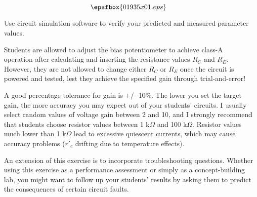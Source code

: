 

$$\epsfbox{01935x01.eps}$$

\vfil \eject






Use circuit simulation software to verify your predicted and measured parameter values.







Students are allowed to adjust the bias potentiometer to achieve class-A operation after calculating and inserting the resistance values $R_C$ and $R_E$.  However, they are not allowed to change either $R_C$ or $R_E$ once the circuit is powered and tested, lest they achieve the specified gain through trial-and-error!

A good percentage tolerance for gain is +/- 10\%.  The lower you set the target gain, the more accuracy you may expect out of your students' circuits.  I usually select random values of voltage gain between 2 and 10, and I strongly recommend that students choose resistor values between 1 k$\Omega$ and 100 k$\Omega$.  Resistor values much lower than 1 k$\Omega$ lead to excessive quiescent currents, which may cause accuracy problems ($r'_e$ drifting due to temperature effects).

An extension of this exercise is to incorporate troubleshooting questions.  Whether using this exercise as a performance assessment or simply as a concept-building lab, you might want to follow up your students' results by asking them to predict the consequences of certain circuit faults.




